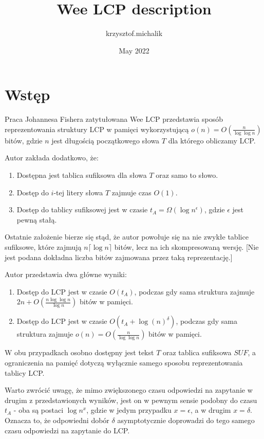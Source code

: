 \documentclass{article}
\title{Wee LCP description}
\author{krzysztof.michalik }
\date{May 2022}
\begin{document}
\maketitle

\section{Wstęp}

Praca Johannesa Fishera zatytułowana Wee LCP przedstawia sposób reprezentowania struktury LCP w pamięci wykorzystującą $o(n) = O(\frac{n}{\log{\log{n}}})$ bitów, gdzie $n$ jest długością początkowego słowa $T$ dla którego obliczamy LCP.

Autor zakłada dodatkowo, że:
\begin{enumerate}
    \item Dostępna jest tablica sufiksowa dla słowa $T$ oraz samo to słowo.
    \item Dostęp do $i$-tej litery słowa $T$ zajmuje czas $O(1)$.
    \item Dostęp do tablicy sufiksowej jest w czasie $t_A = \Omega(\log{n}^{\epsilon})$, gdzie $\epsilon$ jest pewną stałą.
\end{enumerate}
Ostatnie założenie bierze się stąd, że autor powołuje się na nie zwykłe tablice sufiksowe, które zajmują $n \lceil \log{n} \rceil$ bitów, lecz na ich skompresowaną wersję. [Nie jest podana dokładna liczba bitów zajmowana przez taką reprezentację.]

Autor przedstawia dwa główne wyniki:
\begin{enumerate}
    \item Dostęp do LCP jest w czasie $O(t_A)$, podczas gdy sama struktura zajmuje $2n + O(\frac{n \log\log{n}}{\log{n}})$ bitów w pamięci.
    \item Dostęp do LCP jest w czasie $O(t_A + \log(n)^{\delta})$, podczas gdy sama struktura zajmuje $o(n) = O(\frac{n}{\log{\log{n}}})$ bitów w pamięci.
\end{enumerate}

W obu przypadkach osobno dostępny jest tekst $T$ oraz tablica sufiksowa $SUF$, a ograniczenia na pamięć dotyczą wyłącznie samego sposobu reprezentowania tablicy LCP.

Warto zwrócić uwagę, że mimo zwiększonego czasu odpowiedzi na zapytanie w drugim z przedstawionych wyników, jest on w pewnym sensie podobny do czasu $t_A$ - oba są postaci $\log{n}^x$, gdzie w jedym przypadku $x = \epsilon$, a w drugim $x = \delta$. Oznacza to, że odpowiedni dobór $\delta$ asymptotycznie doprowadzi do tego samego czasu odpowiedzi na zapytanie do LCP.
\end{document}
